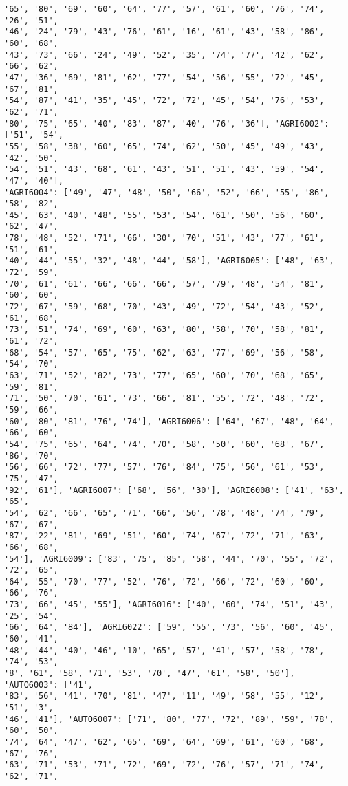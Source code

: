 \documentclass[11pt]{article}
\begin{document}
\begin{Verbatim}[commandchars=\\\{\}]
'65', '80', '69', '60', '64', '77', '57', '61', '60', '76', '74', '26', '51',
'46', '24', '79', '43', '76', '61', '16', '61', '43', '58', '86', '60', '68',
'43', '73', '66', '24', '49', '52', '35', '74', '77', '42', '62', '66', '62',
'47', '36', '69', '81', '62', '77', '54', '56', '55', '72', '45', '67', '81',
'54', '87', '41', '35', '45', '72', '72', '45', '54', '76', '53', '62', '71',
'80', '75', '65', '40', '83', '87', '40', '76', '36'], 'AGRI6002': ['51', '54',
'55', '58', '38', '60', '65', '74', '62', '50', '45', '49', '43', '42', '50',
'54', '51', '43', '68', '61', '43', '51', '51', '43', '59', '54', '47', '40'],
'AGRI6004': ['49', '47', '48', '50', '66', '52', '66', '55', '86', '58', '82',
'45', '63', '40', '48', '55', '53', '54', '61', '50', '56', '60', '62', '47',
'78', '48', '52', '71', '66', '30', '70', '51', '43', '77', '61', '51', '61',
'40', '44', '55', '32', '48', '44', '58'], 'AGRI6005': ['48', '63', '72', '59',
'70', '61', '61', '66', '66', '66', '57', '79', '48', '54', '81', '60', '60',
'72', '67', '59', '68', '70', '43', '49', '72', '54', '43', '52', '61', '68',
'73', '51', '74', '69', '60', '63', '80', '58', '70', '58', '81', '61', '72',
'68', '54', '57', '65', '75', '62', '63', '77', '69', '56', '58', '54', '70',
'63', '71', '52', '82', '73', '77', '65', '60', '70', '68', '65', '59', '81',
'71', '50', '70', '61', '73', '66', '81', '55', '72', '48', '72', '59', '66',
'60', '80', '81', '76', '74'], 'AGRI6006': ['64', '67', '48', '64', '66', '60',
'54', '75', '65', '64', '74', '70', '58', '50', '60', '68', '67', '86', '70',
'56', '66', '72', '77', '57', '76', '84', '75', '56', '61', '53', '75', '47',
'92', '61'], 'AGRI6007': ['68', '56', '30'], 'AGRI6008': ['41', '63', '65',
'54', '62', '66', '65', '71', '66', '56', '78', '48', '74', '79', '67', '67',
'87', '22', '81', '69', '51', '60', '74', '67', '72', '71', '63', '66', '68',
'54'], 'AGRI6009': ['83', '75', '85', '58', '44', '70', '55', '72', '72', '65',
'64', '55', '70', '77', '52', '76', '72', '66', '72', '60', '60', '66', '76',
'73', '66', '45', '55'], 'AGRI6016': ['40', '60', '74', '51', '43', '25', '54',
'66', '64', '84'], 'AGRI6022': ['59', '55', '73', '56', '60', '45', '60', '41',
'48', '44', '40', '46', '10', '65', '57', '41', '57', '58', '78', '74', '53',
'8', '61', '58', '71', '53', '70', '47', '61', '58', '50'], 'AUTO6003': ['41',
'83', '56', '41', '70', '81', '47', '11', '49', '58', '55', '12', '51', '3',
'46', '41'], 'AUTO6007': ['71', '80', '77', '72', '89', '59', '78', '60', '50',
'74', '64', '47', '62', '65', '69', '64', '69', '61', '60', '68', '67', '76',
'63', '71', '53', '71', '72', '69', '72', '76', '57', '71', '74', '62', '71',

\end{Verbatim}
\end{document}
